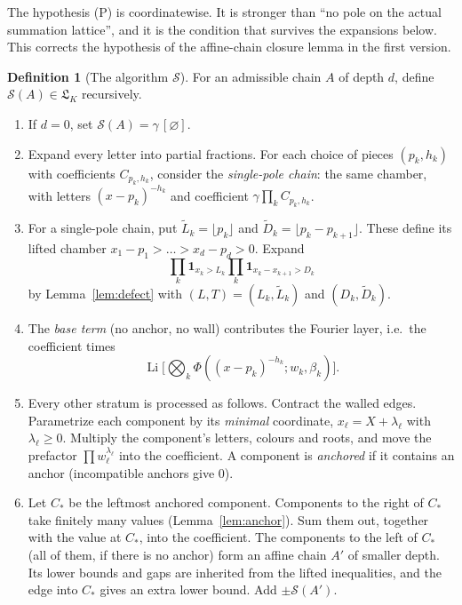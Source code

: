 \documentclass[11pt]{amsart}
\theoremstyle{definition}
\newtheorem{definition}[theorem]{Definition}
\theoremstyle{remark}
\numberwithin{equation}{section}
\newcommand{\Li}{\operatorname{Li}}
\newcommand{\cS}{\mathcal{S}}
\newcommand{\fL}{\mathfrak{L}}
\newcommand{\one}{\mathbf{1}}
\newcommand{\lfl}{\lfloor}
\newcommand{\rfl}{\rfloor}
\begin{document}
The hypothesis (P) is coordinatewise. It is stronger than ``no pole on the actual summation lattice'', and it is the condition that survives the expansions below. This corrects the hypothesis of the affine-chain closure lemma in the first version.

\begin{definition}[The algorithm $\cS$]\label{def:alg}
For an admissible chain $A$ of depth $d$, define $\cS(A)\in\fL_K$ recursively.
\begin{enumerate}[label=(\arabic*),leftmargin=2em]
\item If $d=0$, set $\cS(A)=\gamma\,[\varnothing]$.
\item Expand every letter into partial fractions. For each choice of pieces $(p_k,h_k)$ with coefficients $C_{p_k,h_k}$, consider the \emph{single-pole chain}: the same chamber, with letters $(x-p_k)^{-h_k}$ and coefficient $\gamma\prod_kC_{p_k,h_k}$.
\item For a single-pole chain, put $\tilde L_k=\lfl p_k\rfl$ and $\tilde D_k=\lfl p_k-p_{k+1}\rfl$. These define its lifted chamber $x_1-p_1>\dots>x_d-p_d>0$. Expand
\[
\prod_k\one_{x_k>L_k}\prod_k\one_{x_k-x_{k+1}>D_k}
\]
by Lemma~\ref{lem:defect} with $(L,T)=(L_k,\tilde L_k)$ and $(D_k,\tilde D_k)$.
\item The \emph{base term} (no anchor, no wall) contributes the Fourier layer, i.e.\ the coefficient times
\[
\Li\big[\textstyle\bigotimes_k\Phi((x-p_k)^{-h_k};w_k,\beta_k)\big].
\]
\item Every other stratum is processed as follows. Contract the walled edges. Parametrize each component by its \emph{minimal} coordinate, $x_\ell=X+\lambda_\ell$ with $\lambda_\ell\ge0$. Multiply the component's letters, colours and roots, and move the prefactor $\prod w_\ell^{\lambda_\ell}$ into the coefficient. A component is \emph{anchored} if it contains an anchor (incompatible anchors give $0$).
\item Let $C_*$ be the leftmost anchored component. Components to the right of $C_*$ take finitely many values (Lemma~\ref{lem:anchor}). Sum them out, together with the value at $C_*$, into the coefficient. The components to the left of $C_*$ (all of them, if there is no anchor) form an affine chain $A'$ of smaller depth. Its lower bounds and gaps are inherited from the lifted inequalities, and the edge into $C_*$ gives an extra lower bound. Add $\pm\cS(A')$.
\end{enumerate}
\end{definition}
\end{document}
